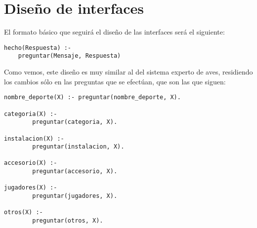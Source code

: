 \chapter{Diseño de interfaces}

El formato básico que seguirá el diseño de las interfaces será el siguiente:

\begin{verbatim}
hecho(Respuesta) :- 
	preguntar(Mensaje, Respuesta)
\end{verbatim}


Como vemos, este diseño es muy similar al del sistema experto de aves, residiendo los cambios sólo en las preguntas que se efectúan, que son las que siguen:

\begin{verbatim}
nombre_deporte(X) :- preguntar(nombre_deporte, X).

categoria(X) :-
        preguntar(categoria, X).

instalacion(X) :-
        preguntar(instalacion, X).

accesorio(X) :-
        preguntar(accesorio, X).

jugadores(X) :-
        preguntar(jugadores, X).

otros(X) :-
        preguntar(otros, X).
\end{verbatim}
